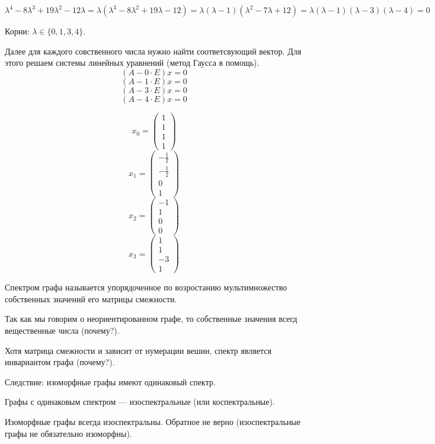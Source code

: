 \begin{example}
$$
\lambda^4-8\lambda^3+19\lambda^2-12\lambda  = \lambda (\lambda^3 - 8\lambda^2 + 19\lambda - 12) = \lambda(\lambda - 1)(\lambda^2 - 7\lambda + 12) = \lambda(\lambda - 1)(\lambda - 3)(\lambda - 4) = 0
$$

Корни: $\lambda \in \{0,1,3,4\}$.

Далее для каждого совственного числа нужно найти соответсвующий вектор. Для этого решаем системы линейных уравнений (метод Гаусса в помощь).
$$(A - 0\cdot E) x = 0$$
$$(A - 1\cdot E) x = 0$$
$$(A - 3\cdot E) x = 0$$
$$(A - 4\cdot E) x = 0$$

$$x_0 = \left(\begin{array}{r}1\\1\\1\\1\end{array}\right)$$
$$x_1 = \left(\begin{array}{r}-\frac{1}{2}\\-\frac{1}{2}\\0\\1\end{array}\right)$$
$$x_2 = \left(\begin{array}{r}-1\\1\\0\\0\end{array}\right)$$
$$x_3 = \left(\begin{array}{r}1\\1\\-3\\1\end{array}\right)$$


\end{example}

\begin{definition}
Спектром графа называется упорядоченное по возростанию мультимножество собственных значений его матрицы смежности.
\end{definition}

Так как мы говорим о неориентированном графе, то собственные значения всегд вещественные числа (почему?).

Хотя матрица смежности и зависит от нумерации вешин, спектр является инвариантом графа (почему?).

Следствие: изоморфные графы имеют одинаковый спектр.

Графы с одинаковым спектром --- изоспектральные (или коспектральные).

\begin{theorem}
Изоморфные графы всегда изоспектральны. Обратное не верно (изоспектральные графы не обязательно изоморфны).
\end{theorem}

